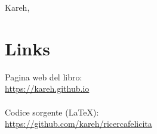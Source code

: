 \begin{flushright}
    \vspace*{\fill}
    Kareh, \finishDate
\end{flushright}

\section{Links}

Pagina web del libro:\\
\url{https://kareh.github.io}\\

\leavevmode\\
Codice sorgente (LaTeX):\\
\url{https://github.com/kareh/ricercafelicita}

